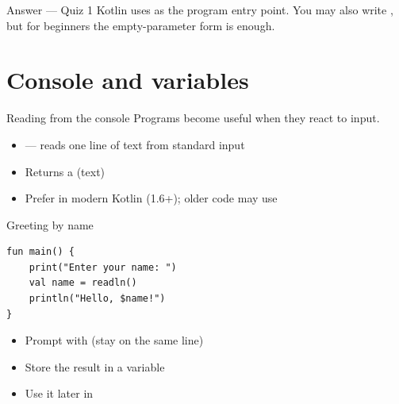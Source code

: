 \documentclass[aspectratio=169,11pt]{beamer}
\begin{document}
    \begin{frame}{Answer --- Quiz 1}
        \vspace{0.4em}
        Kotlin uses  as the program entry point.
        You may also write , but for
        beginners the empty-parameter form is enough.
    \end{frame}

    \section{Console and variables}

    \begin{frame}{Reading from the console}
        Programs become useful when they react to input.
        \vspace{0.6em}
        \begin{itemize}
            \item {} --- reads one line of text from standard input
            \item Returns a  (text)
            \item Prefer  in modern Kotlin (1.6+); older code may use
        \end{itemize}
        \vspace{0.5em}
    \end{frame}

    \begin{frame}[fragile]{Greeting by name}
        \begin{lstlisting}
fun main() {
    print("Enter your name: ")
    val name = readln()
    println("Hello, $name!")
}
        \end{lstlisting}
        \vspace{0.4em}
        \begin{itemize}
            \item Prompt with  (stay on the same line)
            \item Store the result in a variable
            \item Use it later in 
        \end{itemize}
    \end{frame}
\end{document}
